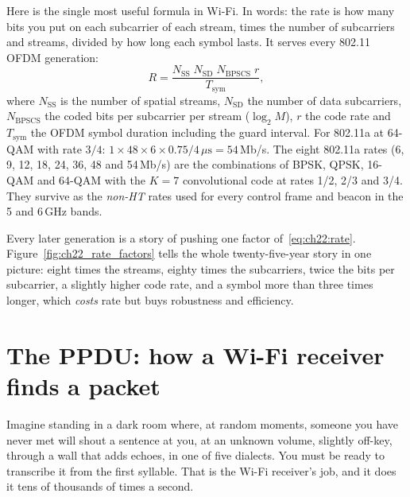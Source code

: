 Here is the single most useful formula in Wi-Fi. In words: the rate is how many bits you put on
each subcarrier of each stream, times the number of subcarriers and streams, divided by how long
each symbol lasts. It serves every 802.11 OFDM generation:
\begin{equation}
R=\frac{N_{\text{SS}}\;N_{\text{SD}}\;N_{\text{BPSCS}}\;r}{T_{\text{sym}}},
\label{eq:ch22:rate}
\end{equation}
where $N_{\text{SS}}$ is the number of spatial streams, $N_{\text{SD}}$ the number of data
subcarriers, $N_{\text{BPSCS}}$ the coded bits per subcarrier per stream ($\log_2 M$), $r$ the code
rate and $T_{\text{sym}}$ the OFDM symbol duration including the guard interval. For 802.11a at
64-QAM with rate $3/4$: $1\times48\times6\times0.75/4\,\mu\text{s}=54$\,Mb/s. The eight 802.11a rates
(6, 9, 12, 18, 24, 36, 48 and 54\,Mb/s) are the combinations of BPSK, QPSK, 16-QAM and 64-QAM with
the $K=7$ convolutional code at rates 1/2, 2/3 and 3/4. They survive as the \emph{non-HT} rates used
for every control frame and beacon in the 5 and 6\,GHz bands.

Every later generation is a story of pushing one factor of~\eqref{eq:ch22:rate}.
Figure~\ref{fig:ch22_rate_factors} tells the whole twenty-five-year story in one picture: eight
times the streams, eighty times the subcarriers, twice the bits per subcarrier, a slightly higher
code rate, and a symbol more than three times longer, which \emph{costs} rate but buys robustness
and efficiency.


\section{The PPDU: how a Wi-Fi receiver finds a packet}
\label{sec:ch22:ppdu}

Imagine standing in a dark room where, at random moments, someone you have never met will shout a
sentence at you, at an unknown volume, slightly off-key, through a wall that adds echoes, in one of
five dialects. You must be ready to transcribe it from the first syllable. That is the Wi-Fi
receiver's job, and it does it tens of thousands of times a second.

